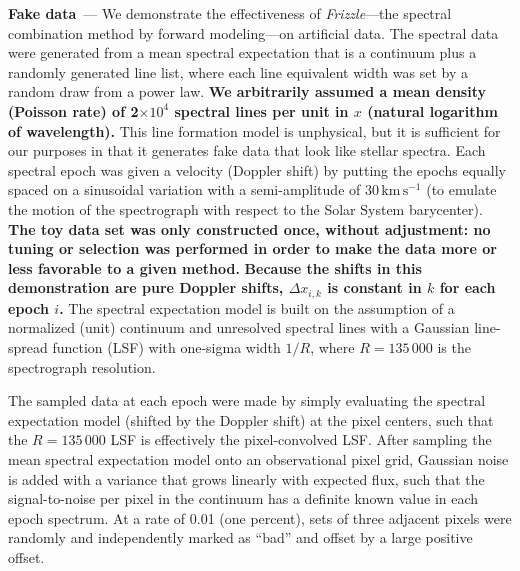 \documentclass[modern, linenumbers]{aastex631}
\renewcommand{\paragraph}[1]{\medskip\par\noindent\textbf{#1}~---}
\newcommand{\name}{\textsl{Frizzle}}
\newcommand{\unit}[1]{\mathrm{#1}}
\newcommand{\kmps}{\unit{km\,s^{-1}}}
\newcommand{\modified}[1]{\textcolor{Emerald}{\textbf{#1}}}
\begin{document}
\paragraph{Fake data}
We demonstrate the effectiveness of \name{}---the spectral combination method by forward modeling---on artificial data.
The spectral data were generated from a mean spectral expectation that is a continuum plus a randomly generated line list, where each line equivalent width was set by a random draw from a power law.
\modified{We arbitrarily assumed a mean density (Poisson rate) of 2$\times{}10^4$ spectral lines per unit in $x$ (natural logarithm of wavelength).}
This line formation model is unphysical, but it is sufficient for our purposes in that it generates fake data that look like stellar spectra.
Each spectral epoch was given a velocity (Doppler shift) by putting the epochs equally spaced on a sinusoidal variation with a semi-amplitude of $30\,\kmps$ (to emulate the motion of the spectrograph with respect to the Solar System barycenter). \modified{The toy data set was only constructed once, without adjustment: no tuning or selection was performed in order to make the data more or less favorable to a given method.} \modified{Because the shifts in this demonstration are pure Doppler shifts, $\Delta x_{i,k}$ is constant in $k$ for each epoch $i$.}
The spectral expectation model is built on the assumption of a normalized (unit) continuum and unresolved spectral lines with a Gaussian line-spread function (LSF) with one-sigma width $1/R$, where $R=135\,000$ is the spectrograph resolution.


The sampled data at each epoch were made by simply evaluating the spectral expectation model (shifted by the Doppler shift) at the pixel centers, such that the $R=135\,000$ LSF is effectively the pixel-convolved LSF.
After sampling the mean spectral expectation model onto an observational pixel grid, Gaussian noise is added with a variance that grows linearly with expected flux, such that the signal-to-noise per pixel in the continuum has a definite known value in each epoch spectrum.
At a rate of 0.01 (one percent), sets of three adjacent pixels were randomly and independently marked as ``bad'' and offset by a large positive offset.
\end{document}
